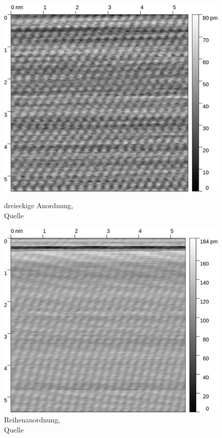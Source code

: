 \documentclass[12pt,a4paper]{scrartcl}
\numberwithin{equation}{section} %
\begin{document}
\begin{figure}[h!]
	\begin{minipage}[t]{0.5\textwidth}
		\includegraphics[width=\linewidth]{../media/B2.5/Atoms_1.jpg}
		\caption{dreieckige Anordnung, \\Quelle \cite{Grover}}
		\label{fig:hopg_1}
	\end{minipage}
	\begin{minipage}[t]{0.5\textwidth}
		\includegraphics[width=\linewidth]{../media/B2.5/Atoms_2.jpg}
		\caption{Reihenanordnung, \\Quelle \cite{Grover}}
		\label{fig:hopg_2}
	\end{minipage}
\end{figure}
\end{document}
